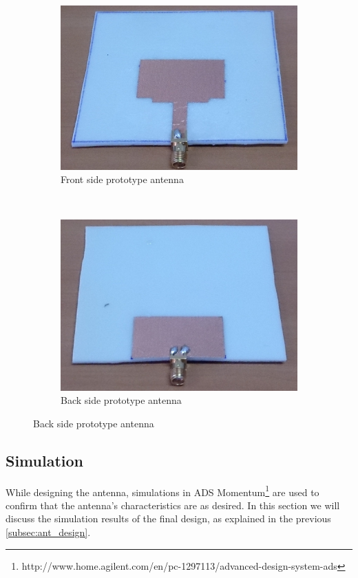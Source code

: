 \documentclass[a4paper]{article}        %
\begin{document}
	\begin{figure}[H]
	\centering
	\begin{subfigure}[b]{0.52\textwidth}
                \includegraphics[width=\textwidth]{images/patch_proto_front}
                \caption{Front side prototype antenna}
                \label{fig:front_prototype}
        \end{subfigure}%
  ~      
        \begin{subfigure}[b]{0.5\textwidth}
                \includegraphics[width=\textwidth]{images/patch_proto_back}
                \caption{Back side prototype antenna}
                \label{fig:back_prototype}
        \end{subfigure}
	\end{figure}

	\subsection{Simulation}
		While designing the antenna, simulations in ADS Momentum\footnote{http://www.home.agilent.com/en/pc-1297113/advanced-design-system-ads} are used to confirm that the antenna's characteristics are as desired. In this section we will discuss the simulation results of the final design, as explained in the previous \autoref{subsec:ant_design}. 
\end{document}
